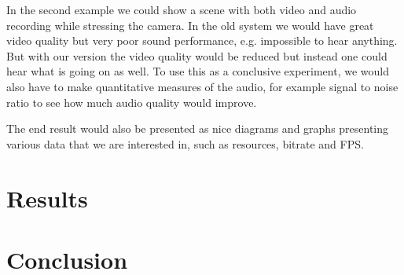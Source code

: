 \documentclass{LTHthesis}
\begin{document}
In the second example we could show a scene with both video and audio recording while stressing the camera. In the old system we would have great video quality but very poor sound performance, e.g. impossible to hear anything. But with our version the video quality would be reduced but instead one could hear what is going on as well. To use this as a conclusive experiment, we would also have to make quantitative measures of the audio, for example signal to noise ratio to see how much audio quality would improve.

The end result would also be presented as nice diagrams and graphs presenting various data that we are interested in, such as resources, bitrate and FPS.

\chapter{Results}

\chapter{Conclusion}

\printbibliography  %
%
%
\end{document}
